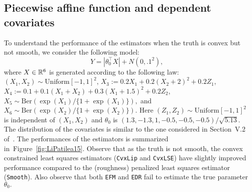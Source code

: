 \subsection{Piecewise affine function and dependent covariates}
 To understand the performance of the estimators when the truth is convex but not smooth, we consider the following model:
\begin{equation}\label{eq:V_mod}
Y=|\theta_0^\top X| + N(0, .1^2),
\end{equation}
where $X\in\mathbb{R}^6$ is generated according to the following law: $(X_1, X_2) \sim \text{Uniform} [-1,1]^2$, $ X_3:=0.2 X_1+ 0.2 (X_2+2)^2+0.2 Z_1$, $X_4:=0.1+ 0.1(X_1+X_2)+0.3(X_1+1.5)^2+  0.2 Z_2$, $X_5 \sim \text{Ber}(\exp(X_1)/\{1+\exp(X_1)\}),$ and  $ X_6 \sim \text{Ber}(\exp(X_2)/\{1+\exp(X_2)\})$. Here $(Z_1, Z_2)\sim\text{Uniform} [-1,1]^2$ is independent of $(X_1,X_2)$ and $\theta_0$ is $(1.3, -1.3, 1, -0.5, -0.5, -0.5)/\sqrt{5.13}$.  The distribution of the covariates is similar to the one considered in Section~V.2 of~\cite{LiPatilea15}. The performances of the estimators is summarized in~Figure~\ref{fig:LiPatilea15}.  Observe that as the truth is not smooth, the convex constrained least squares estimators (\texttt{CvxLip} and \texttt{CvxLSE}) have slightly improved performance compared to the (roughness) penalized least squares estimator (\texttt{Smooth}). Also observe that both \texttt{EFM} and \texttt{EDR} fail to estimate the true parameter $\theta_0.$
